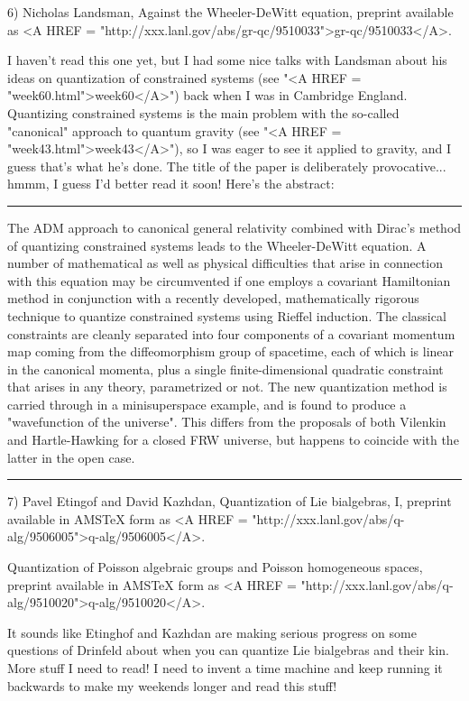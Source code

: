 6) Nicholas Landsman, Against the Wheeler-DeWitt equation, preprint 
available as <A HREF =
"http://xxx.lanl.gov/abs/gr-qc/9510033">gr-qc/9510033</A>.   

I haven't read this one yet, but I had some nice talks with Landsman
about his ideas on quantization of constrained systems (see "<A HREF = "week60.html">week60</A>")
back when I was in Cambridge England.  Quantizing constrained systems is 
the main problem with the so-called "canonical" approach to quantum
gravity (see "<A HREF = "week43.html">week43</A>"), so I was eager to see it applied to gravity, and
I guess that's what he's done.  The title of the paper is deliberately
provocative... hmmm, I guess I'd better read it soon!  Here's the abstract:

\par\noindent\rule{\textwidth}{0.4pt}
The ADM approach to canonical general relativity combined with Dirac's
method of quantizing constrained systems leads to the Wheeler-DeWitt
equation. A number of mathematical as well as physical difficulties that
arise in connection with this equation may be circumvented if one
employs a covariant Hamiltonian method in conjunction with a recently
developed, mathematically rigorous technique to quantize constrained
systems using Rieffel induction. The classical constraints are cleanly
separated into four components of a covariant momentum map coming from
the diffeomorphism group of spacetime, each of which is linear in the
canonical momenta, plus a single finite-dimensional quadratic constraint
that arises in any theory, parametrized or not. The new quantization
method is carried through in a minisuperspace example, and is found to
produce a "wavefunction of the universe". This differs from the
proposals of both Vilenkin and Hartle-Hawking for a closed FRW universe,
but happens to coincide with the latter in the open case.
\par\noindent\rule{\textwidth}{0.4pt}

7) Pavel Etingof and David Kazhdan, Quantization of Lie bialgebras, I,
preprint available in AMSTeX form as <A HREF =
"http://xxx.lanl.gov/abs/q-alg/9506005">q-alg/9506005</A>.   

Quantization of Poisson algebraic groups and Poisson homogeneous spaces,
preprint available in AMSTeX form as <A HREF =
"http://xxx.lanl.gov/abs/q-alg/9510020">q-alg/9510020</A>.   

It sounds like Etinghof and Kazhdan are making serious progress on some
questions of Drinfeld about when you can quantize Lie bialgebras and
their kin.  More stuff I need to read!  I need to invent a time machine
and keep running it backwards to make my weekends longer and read this
stuff! 


